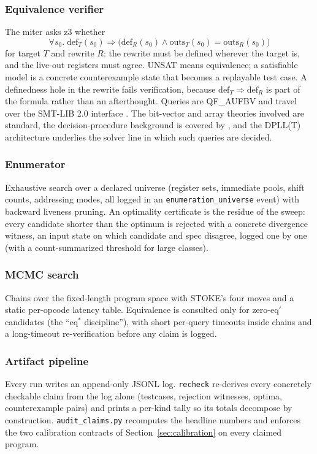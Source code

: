 \documentclass[journal,10pt]{IEEEtran}
\begin{document}
\subsubsection{Equivalence verifier} The miter asks z3 \cite{z3}
whether
\begin{equation}
\forall s_0.\; \mathrm{def}_T(s_0) \Rightarrow
\bigl(\mathrm{def}_R(s_0) \wedge \mathrm{outs}_T(s_0) = \mathrm{outs}_R(s_0)\bigr)
\label{eq:miter}
\end{equation}
for target $T$ and rewrite $R$: the rewrite must be defined wherever
the target is, and the live-out registers must agree. UNSAT means
equivalence; a satisfiable model is a concrete counterexample state
that becomes a replayable test case. A definedness hole in the rewrite
fails verification, because $\mathrm{def}_T \Rightarrow \mathrm{def}_R$
is part of the formula rather than an afterthought. Queries are
QF\_AUFBV and travel over the SMT-LIB 2.0 interface \cite{smtlib10}.
The bit-vector \cite{beaver09} and array \cite{arrays01} theories
involved are standard, the decision-procedure background is covered by
\cite{smt-handbook18,kroening08}, and the DPLL(T) architecture
\cite{dutertre06,nieuwenhuis06} underlies the solver line
\cite{cvc4,cvc5,mathsat05} in which such queries are decided.

\subsubsection{Enumerator} Exhaustive search over a declared universe
(register sets, immediate pools, shift counts, addressing modes, all
logged in an \texttt{enumeration\_universe} event) with backward
liveness pruning. An optimality certificate is the residue of the
sweep: every candidate shorter than the optimum is rejected with a
concrete divergence witness, an input state on which candidate and
spec disagree, logged one by one (with a count-summarized threshold
for large classes).

\subsubsection{MCMC search} Chains over the fixed-length program space
with STOKE's four moves and a static per-opcode latency table.
Equivalence is consulted only for zero-$\mathrm{eq}'$ candidates (the
``$\mathrm{eq}^*$ discipline''), with short per-query timeouts inside
chains and a long-timeout re-verification before any claim is logged.

\subsubsection{Artifact pipeline} Every run writes an append-only JSONL
log. \texttt{recheck} re-derives every concretely checkable claim from
the log alone (testcases, rejection witnesses, optima, counterexample
pairs) and prints a per-kind tally so its totals decompose by
construction. \texttt{audit\_claims.py} recomputes the headline
numbers and enforces the two calibration contracts of
Section~\ref{sec:calibration} on every claimed program.
\end{document}
